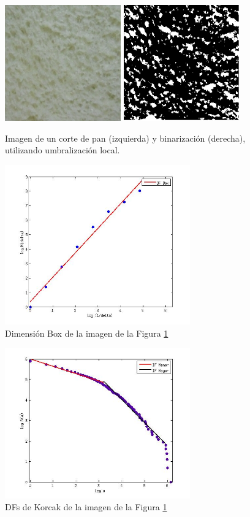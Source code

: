 \begin{figure}
\centering
\includegraphics[width=5cm]{figures/lactal}
\includegraphics[width=5cm]{figures/lactalBin}
\caption{Imagen de un corte de pan (izquierda) y binarización (derecha), utilizando umbralización local.}
\label{bin}
\end{figure}

\begin{figure}
\centering
\includegraphics[width=8cm]{figures/fitbox}
\caption{Dimensi\'on Box de la imagen de la Figura \ref{bin}}
\label{fitbox}
\end{figure}


\begin{figure}
\centering
\includegraphics[width=8cm]{figures/lactal1PlotKorcak}
\caption{DFs de Korcak de la imagen de la Figura \ref{bin}}
\label{fit}
\end{figure}

